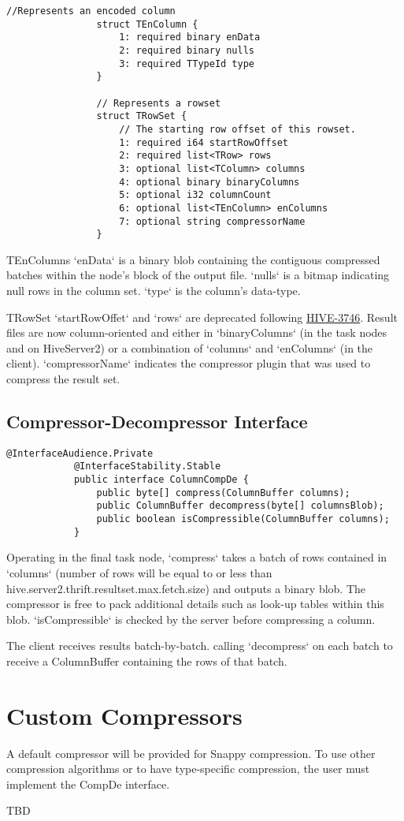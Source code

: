 \documentclass[11pt,a4paper]{article}
\begin{document}
			\begin{lstlisting}[title=TCLIService.thrift,gobble=8,otherkeywords={binary,i32,i64,string,struct,TColumn,TEnColumn,TRow,TRowSet,TTypeId}]
				//Represents an encoded column
				struct TEnColumn {
					1: required binary enData
					2: required binary nulls
					3: required TTypeId type
				}
				
				// Represents a rowset
				struct TRowSet {
					// The starting row offset of this rowset.
					1: required i64 startRowOffset
					2: required list<TRow> rows
					3: optional list<TColumn> columns
					4: optional binary binaryColumns
					5: optional i32 columnCount
					6: optional list<TEnColumn> enColumns
					7: optional string compressorName
				}
			\end{lstlisting}
			
			TEnColumns `enData` is a binary blob containing the contiguous compressed batches within the node's block of the output file.
			`nulls` is a bitmap indicating null rows in the column set.
			`type` is the column's data-type.
			
			TRowSet `startRowOffet` and `rows` are deprecated following \href{https://issues.apache.org/jira/browse/HIVE-3746}{HIVE-3746}.
			Result files are now column-oriented and either in `binaryColumns` (in the task nodes and on HiveServer2) or a combination of `columns` and `enColumns` (in the client).
			`compressorName` indicates the compressor plugin that was used to compress the result set.
			
	\subsection{Compressor-Decompressor Interface}
		\begin{lstlisting}[title=org.apache.hive.service.cli.CompDe; CompDe.java,gobble=6,otherkeywords={ColumnBuffer}]
			@InterfaceAudience.Private
			@InterfaceStability.Stable
			public interface ColumnCompDe {
				public byte[] compress(ColumnBuffer columns);
				public ColumnBuffer decompress(byte[] columnsBlob);
				public boolean isCompressible(ColumnBuffer columns);
			}
		\end{lstlisting}
		
		Operating in the final task node, `compress` takes a batch of rows contained in `columns` (number of rows will be equal to or less than \linebreak hive.server2.thrift.resultset.max.fetch.size) and outputs a binary blob.
		The compressor is free to pack additional details such as look-up tables within this blob.
		`isCompressible` is checked by the server before compressing a column.
		
		The client receives results batch-by-batch. calling `decompress` on each batch to receive a ColumnBuffer containing the rows of that batch.
			
\section{Custom Compressors}
		A default compressor will be provided for Snappy compression.
		To use other compression algorithms or to have type-specific compression, the user must implement the CompDe interface.
		
		TBD
		
\end{document}
